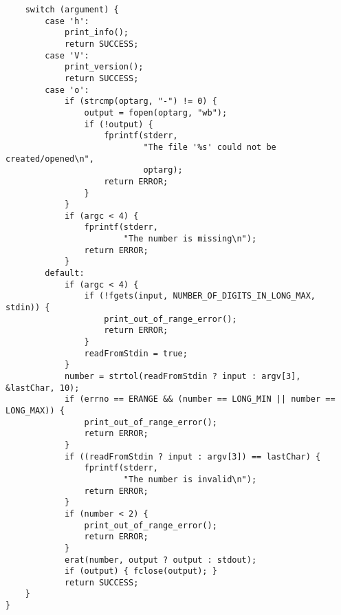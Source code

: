 \documentclass[a4paper,10pt]{article}
\begin{document}
\begin{verbatim}
    switch (argument) {
        case 'h':
            print_info();
            return SUCCESS;
        case 'V':
            print_version();
            return SUCCESS;
        case 'o':
            if (strcmp(optarg, "-") != 0) {
                output = fopen(optarg, "wb");
                if (!output) {
                    fprintf(stderr,
                            "The file '%s' could not be created/opened\n",
                            optarg);
                    return ERROR;
                }
            }
            if (argc < 4) {
                fprintf(stderr,
                        "The number is missing\n");
                return ERROR;
            }
        default:
            if (argc < 4) {
                if (!fgets(input, NUMBER_OF_DIGITS_IN_LONG_MAX, stdin)) {
                    print_out_of_range_error();
                    return ERROR;
                }
                readFromStdin = true;
            }
            number = strtol(readFromStdin ? input : argv[3], &lastChar, 10);
            if (errno == ERANGE && (number == LONG_MIN || number == LONG_MAX)) {
                print_out_of_range_error();
                return ERROR;
            }
            if ((readFromStdin ? input : argv[3]) == lastChar) {
                fprintf(stderr,
                        "The number is invalid\n");
                return ERROR;
            }
            if (number < 2) {
                print_out_of_range_error();
                return ERROR;
            }
            erat(number, output ? output : stdout);
            if (output) { fclose(output); }
            return SUCCESS;
    }
}

  \end{verbatim}
  
\end{document}
